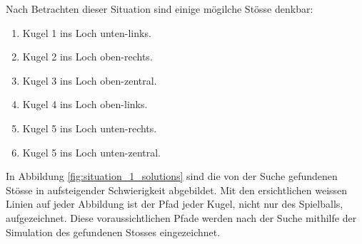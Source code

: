 Nach Betrachten dieser Situation sind einige mögilche Stösse denkbar:
\begin{enumerate}
    \item Kugel 1 ins Loch unten-links.
    \item Kugel 2 ins Loch oben-rechts.
    \item Kugel 3 ins Loch oben-zentral.
    \item Kugel 4 ins Loch oben-links.
    \item Kugel 5 ins Loch unten-rechts.
    \item Kugel 5 ins Loch unten-zentral.
\end{enumerate}

In Abbildung \ref{fig:situation_1_solutions} sind die von der Suche gefundenen Stösse in aufsteigender Schwierigkeit abgebildet.
Mit den ersichtlichen weissen Linien auf jeder Abbildung ist der Pfad jeder Kugel, nicht nur des Spielballs, aufgezeichnet.
Diese voraussichtlichen Pfade werden nach der Suche mithilfe der Simulation des gefundenen Stosses eingezeichnet.

